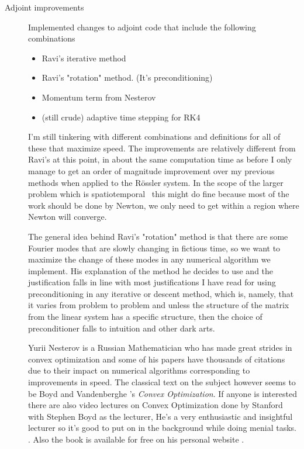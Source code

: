 \begin{description}
{\begin{description}
\item[Adjoint improvements]
Implemented changes to adjoint code that include the following combinations

\begin{itemize}
\item Ravi's iterative method
\item Ravi's "rotation" method. (It's preconditioning)
\item Momentum term from Nesterov
\item (still crude) adaptive time stepping for RK4
\end{itemize}

I'm still tinkering with different combinations and definitions for all of these that
maximize speed. The improvements are relatively different from Ravi's at this point, in
about the same computation time as before I only manage to get an order of magnitude
improvement over my previous methods when applied to the R\"ossler system. In the scope
of the larger problem which is spatiotemporal \KSe\ this might do fine because most
of the work should be done by Newton, we only need to get within a region where Newton
will converge.

The general idea behind Ravi's "rotation" method is that there are some Fourier modes
that are slowly changing in fictious time, so we want to maximize the change of
these modes in any numerical algorithm we implement. His explanation of the method
he decides to use and the justification falls in line with most justifications
I have read for using preconditioning in any iterative or descent method, which is,
namely, that it varies from problem to problem and unless the structure of the matrix
from the linear system has a specific structure, then the choice of preconditioner
falls to intuition and other dark arts.

Yurii Nesterov is a Russian Mathematician who has made great strides in convex optimization
and some of his papers have thousands of citations due to their impact on numerical algorithms
corresponding to improvements in speed. The classical text on the subject however seems to
be Boyd and Vandenberghe 's \textit{Convex Optimization}. If anyone is interested
there are also video lectures on Convex Optimization done by Stanford with Stephen Boyd as the
lecturer, He's a very enthusiastic and insightful lecturer so it's good to put on in the background
while doing menial tasks. .
Also the book is available for free on his personal website .



\end{description}}
\end{description}
